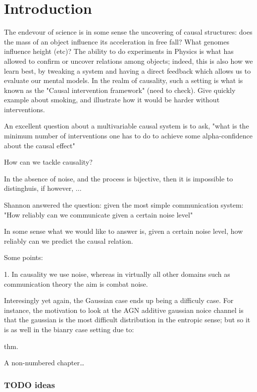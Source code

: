 \cleardoublepage
\chapter*{Introduction}

The endevour of science is in some sense the uncovering of causal structures: does the mass
of an object influence its acceleration in free fall? What genomes influence height (etc)? 
The ability to do experiments in Physics is what has allowed to confirm or uncover relations
among objects; indeed, this is also how we learn best, by tweaking a system and having a 
direct feedback which allows us to evaluate our mental models. In the realm of causality, 
such a setting is what is known as the "Causal intervention framework" (need to check). 
Give quickly example about smoking, and illustrate how it would be harder without interventions.



An excellent question about a multivariable causal system is to ask, "what is the minimum number
of interventions one has to do to achieve some alpha-confidence about the causal effect"


How can we tackle causality?

In the absence of noise, and the process is bijective, then it is impossible to distinghuis, 
if however, ...

Shannon answered the question: given the most simple communication system: "How reliably can 
we communicate given a certain noise level"

In some sense what we would like to answer is, given a certain noise level, how reliably can we 
predict the causal relation. 

Some points:

1. In causality we use noise, whereas in virtually all other domains
 such as communication theory the aim is combat noise.

 Interesingly yet again, the Gaussian case ends up being a difficuly case. For instance, 
 the motivation to look at the AGN additive gaussian noice channel is that the gaussian is 
 the most difficult distribution in the entropic sense; but so it is as well in the 
 bianry case setting due to:

 thm.


A non-numbered chapter\dots

\subsection{TODO ideas}


